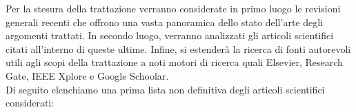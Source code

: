 Per la stesura della trattazione verranno considerate in primo luogo le revisioni generali recenti che offrono una vasta panoramica dello stato dell'arte degli argomenti trattati. In secondo luogo, verranno analizzati gli articoli scientifici citati all'interno di queste ultime. Infine, si estenderà la ricerca di fonti autorevoli utili agli scopi della trattazione a noti motori di ricerca quali Elsevier, Research Gate, IEEE Xplore e Google Schoolar.\\
Di seguito elenchiamo una prima lista non definitiva degli articoli scientifici considerati:


